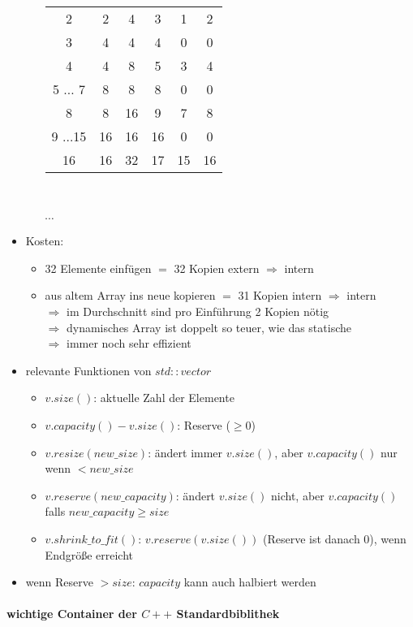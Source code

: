 \documentclass{article}
\begin{document}
\begin{itemize}
\begin{itemize}
\begin{tabular} {c|c|c|c|c|c}
		 		2 & 2 & 4 & 3 & 1 & 2 \\
		 		3 & 4 & 4 & 4 & 0 & 0 \\
		 		4 & 4 & 8 & 5 & 3 & 4 \\
		 		5 $\dots$ 7 & 8 & 8 & 8 & 0 & 0 \\
		 		8 & 8 & 16 & 9 & 7 & 8 \\
		 		9 $\dots$15 & 16 & 16 & 16 & 0 & 0 \\
		 		16 & 16 & 32 & 17 & 15 & 16 \\
	 		\end{tabular} \\ \\
	 				 		$\cdots$
	 	\end{itemize}
	 	
	 	\item Kosten:
	 	\begin{itemize}
	 		\item 32 Elemente einfügen $=$ 32 Kopien extern $\Rightarrow$ intern
	 		\item aus altem Array ins neue kopieren $=$ 31 Kopien intern $\Rightarrow$ intern \\
	 		$\Rightarrow$ im Durchschnitt sind pro Einführung 2 Kopien nötig \\
	 		$\Rightarrow$ dynamisches Array ist doppelt so teuer, wie das statische \\
	 		$\Rightarrow$ immer noch sehr effizient
	 	\end{itemize}
	 	\item relevante Funktionen von $std::vector$
	 	\begin{itemize}
	 		\item $v.size()$: aktuelle Zahl der Elemente
	 		\item $v.capacity()-v.size()$: Reserve ($\geq 0$)
		 	\item $v.resize(new\_size)$: ändert immer $v.size()$, aber $v.capacity()$ nur wenn $< new\_size$
		 	\item $v.reserve(new\_capacity)$: ändert $v.size()$ nicht, aber $v.capacity()$ falls $new\_capacity \geq size$
		 	\item $v.shrink\_to\_fit()$: $v.reserve(v.size())$ (Reserve ist danach 0), wenn Endgröße erreicht
	 	\end{itemize}
	 	\item wenn Reserve $> size$: $capacity$ kann auch halbiert werden
	 \end{itemize}
	 
	 \paragraph{wichtige Container der $C++$ Standardbiblithek}
	 
\end{document}
